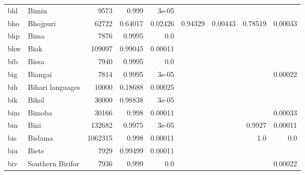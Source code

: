\documentclass[11pt]{article}
\begin{document}
\begin{table*}[ht]
{\begin{tabular}{llrrrrrrr}
bhl         & Bimin         & 9573         & 0.999         & 3e-05         &          &          &          &          \\

bho         & Bhojpuri         & 62722         & 0.64017         & 0.02426         & 0.94329         & 0.00443         & 0.78519         & 0.00033         \\

bhp         & Bima         & 7876         & 0.9995         & 0.0         &          &          &          &          \\

bhw         & Biak         & 109097         & 0.99045         & 0.00011         &          &          &          &          \\

bib         & Bissa         & 7940         & 0.9995         & 0.0         &          &          &          &          \\

big         & Biangai         & 7814         & 0.9995         & 3e-05         &          &          &          & 0.00022         \\

bih         & Bihari languages         & 10000         & 0.18688         & 0.00025         &          &          &          &          \\

bik         & Bikol         & 30000         & 0.98838         & 3e-05         &          &          &          &          \\

bim         & Bimoba         & 30166         & 0.998         & 0.00011         &          &          &          & 0.00033         \\

bin         & Bini         & 132682         & 0.9975         & 3e-05         &          &          & 0.9927         & 0.00011         \\

bis         & Bislama         & 1062315         & 0.998         & 0.00011         &          &          & 1.0         & 0.0         \\

biu         & Biete         & 7929         & 0.99499         & 0.00011         &          &          &          &          \\

biv         & Southern Birifor         & 7936         & 0.999         & 0.0         &          &          &          & 0.00022         \\


\end{tabular}}
\end{table*}
\end{document}
